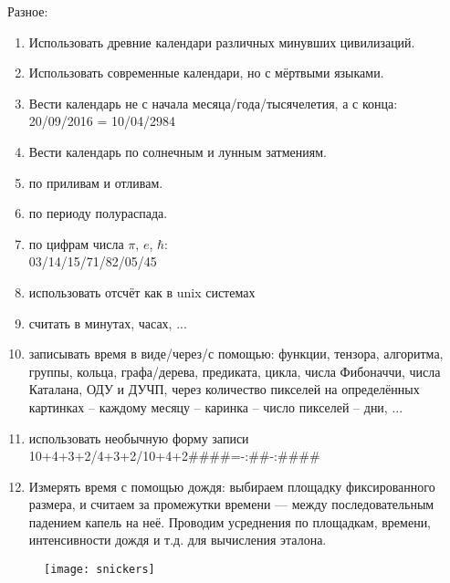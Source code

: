 \begin{flushleft}
    Разное:
    \begin{enumerate}
        \item Использовать древние календари различных минувших цивилизаций.
        \item Использовать современные календари, но с мёртвыми языками.
        \item Вести календарь не с начала месяца/года/тысячелетия, а с конца:\\
            20/09/2016 = 10/04/2984
        \item Вести календарь по солнечным и лунным затмениям.
        \item по приливам и отливам.
        \item по периоду полураспада.
        \item по цифрам числа \( \pi \), \( e \), \( \hbar \):\\
            03/14/15/71/82/05/45
        \item использовать отсчёт как в unix системах
        \item считать в минутах, часах, ...
        \item записывать время в виде/через/с помощью: функции, тензора, алгоритма, группы, кольца, графа/дерева, 
            предиката, цикла, числа Фибоначчи, числа Каталана, ОДУ и ДУЧП, через количество пикселей на 
            определённых картинках -- каждому месяцу -- каринка -- число пикселей -- дни, ...
        \item использовать необычную форму записи\\
            10+4+3+2/4+3+2/10+4+2\qquad \#\#\#\#=-:\#\#-:\#\#\#\#
        \item Измерять время с помощью дождя: выбираем площадку фиксированного размера, и считаем за промежутки времени ---
        между последовательным падением капель на неё. Проводим усреднения по площадкам, времени, интенсивности дождя
        и т.д. для вычисления эталона.
    \end{enumerate}
\end{flushleft}

\begin{figure}[ht!]
    \centering
    \texttt{[image: snickers]}
\end{figure}
